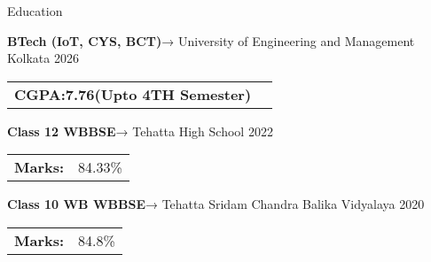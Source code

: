 \documentclass{resume}
\begin{document}

\vspace{-0.4em}
\begin{rSection}{Education}

    {\bf BTech (IoT, CYS, BCT)}→ University of Engineering and Management Kolkata \hfill {2026}\\
    \begin{tabular}{>{\bfseries}l l}
        CGPA:7.76(Upto 4TH Semester)
    \end{tabular}

    \vspace{-0.4em}
    {\bf Class 12 WBBSE}→ Tehatta High School \hfill {2022}\\
    \begin{tabular}{>{\bfseries}l l}
        Marks:    & 84.33\%
    \end{tabular}

    {\bf Class 10 WB WBBSE}→ Tehatta Sridam Chandra Balika Vidyalaya \hfill {2020}\\
    \begin{tabular}{>{\bfseries}l l}
        Marks:    & 84.8\%
    \end{tabular}
\end{rSection}
\vspace{-0.4em}

\end{document}
